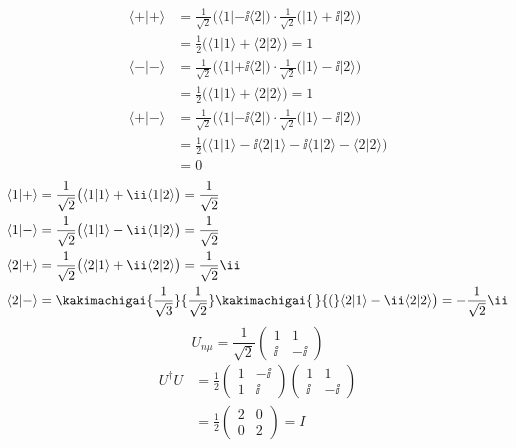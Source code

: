 \begin{align*}
  \langle+|+\rangle&=\frac{1}{\sqrt{2}}\bigl(\langle1|-\ii\langle2|\bigr)\cdot\frac{1}{\sqrt{2}}\bigl(|1\rangle+\ii|2\rangle\bigr)\\
  &=\frac{1}{2}\bigl(\langle1|1\rangle+\langle2|2\rangle\bigr)=1\\
  \langle-|-\rangle&=\frac{1}{\sqrt{2}}\bigl(\langle1|+\ii\langle2|\bigr)\cdot\frac{1}{\sqrt{2}}\bigl(|1\rangle-\ii|2\rangle\bigr)\\
  &=\frac{1}{2}\bigl(\langle1|1\rangle+\langle2|2\rangle\bigr)=1\\
  \langle+|-\rangle&=\frac{1}{\sqrt{2}}\bigl(\langle1|-\ii\langle2|\bigr)\cdot\frac{1}{\sqrt{2}}\bigl(|1\rangle-\ii|2\rangle\bigr)\\
  &=\frac{1}{2}\bigl(\langle1|1\rangle-\ii\langle2|1\rangle-\ii\langle1|2\rangle-\langle2|2\rangle\bigr)\\
  &=0
\end{align*}
\begin{align*}
  \langle1|+\rangle&=\frac{1}{\sqrt{2}}\bigl(\langle1|1\rangle+\ii\langle1|2\rangle\bigr)=\frac{1}{\sqrt{2}}\\
  \langle1|-\rangle&=\frac{1}{\sqrt{2}}\bigl(\langle1|1\rangle-\ii\langle1|2\rangle\bigr)=\frac{1}{\sqrt{2}}\\
  \langle2|+\rangle&=\frac{1}{\sqrt{2}}\bigl(\langle2|1\rangle+\ii\langle2|2\rangle\bigr)=\frac{1}{\sqrt{2}}\ii\\
  \langle2|-\rangle&=\kakimachigai{\frac{1}{\sqrt{3}}}{\frac{1}{\sqrt{2}}}\kakimachigai{\,}{(}\langle2|1\rangle-\ii\langle2|2\rangle\bigr)=-\frac{1}{\sqrt{2}}\ii
\end{align*}
\[
  U_{n\mu}=\frac{1}{\sqrt{2}}\begin{pmatrix}1&1\\\ii&-\ii\end{pmatrix}
\]
\begin{align*}
  U^{\dagger}U&=\frac{1}{2}\begin{pmatrix}1&-\ii\\1&\ii\end{pmatrix}\begin{pmatrix}1&1\\\ii&-\ii\end{pmatrix}\\
  &=\frac{1}{2}\begin{pmatrix}2&0\\0&2\end{pmatrix}=I
\end{align*}
